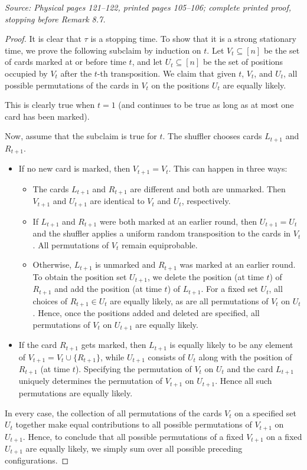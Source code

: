 \documentclass[11pt]{article}
\newcommand{\sourceloc}[1]{\par\smallskip\noindent\textit{Source: #1.}\par\nopagebreak[4]\smallskip}
\begin{document}
\sourceloc{Physical pages 121--122, printed pages 105--106; complete printed proof, stopping before Remark 8.7}
\begin{proof}
It is clear that $\tau$ is a stopping time. To show that it is a strong
stationary time, we prove the following subclaim by induction on $t$.
Let $V_t\subseteq[n]$ be the set of cards marked at or before time $t$,
and let $U_t\subseteq[n]$ be the set of positions occupied by $V_t$
after the $t$-th transposition. We claim that given $t$, $V_t$, and
$U_t$, all possible permutations of the cards in $V_t$ on the positions
$U_t$ are equally likely.

This is clearly true when $t=1$ (and continues to be true as long as at
most one card has been marked).

Now, assume that the subclaim is true for $t$. The shuffler chooses
cards $L_{t+1}$ and $R_{t+1}$.
\begin{itemize}
\item If no new card is marked, then $V_{t+1}=V_t$. This can happen in
three ways:
\begin{itemize}
\item The cards $L_{t+1}$ and $R_{t+1}$ are different and both are
unmarked. Then $V_{t+1}$ and $U_{t+1}$ are identical to $V_t$ and $U_t$,
respectively.
\item If $L_{t+1}$ and $R_{t+1}$ were both marked at an earlier round,
then $U_{t+1}=U_t$ and the shuffler applies a uniform random
transposition to the cards in $V_t$. All permutations of $V_t$ remain
equiprobable.
\item Otherwise, $L_{t+1}$ is unmarked and $R_{t+1}$ was marked at an
earlier round. To obtain the position set $U_{t+1}$, we delete the
position (at time $t$) of $R_{t+1}$ and add the position (at time $t$)
of $L_{t+1}$. For a fixed set $U_t$, all choices of $R_{t+1}\in U_t$
are equally likely, as are all permutations of $V_t$ on $U_t$. Hence,
once the positions added and deleted are specified, all permutations
of $V_t$ on $U_{t+1}$ are equally likely.
\end{itemize}
\item If the card $R_{t+1}$ gets marked, then $L_{t+1}$ is equally
likely to be any element of $V_{t+1}=V_t\cup\{R_{t+1}\}$, while
$U_{t+1}$ consists of $U_t$ along with the position of $R_{t+1}$
(at time $t$). Specifying the permutation of $V_t$ on $U_t$ and the
card $L_{t+1}$ uniquely determines the permutation of $V_{t+1}$ on
$U_{t+1}$. Hence all such permutations are equally likely.
\end{itemize}
In every case, the collection of all permutations of the cards $V_t$
on a specified set $U_t$ together make equal contributions to all
possible permutations of $V_{t+1}$ on $U_{t+1}$. Hence, to conclude that
all possible permutations of a fixed $V_{t+1}$ on a fixed $U_{t+1}$
are equally likely, we simply sum over all possible preceding
configurations.
\end{proof}
\end{document}
